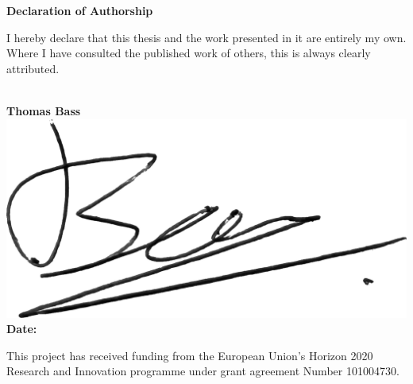 \thispagestyle{empty}
\vspace*{\fill}
\begin{center}
    \textbf{Declaration of Authorship}
\end{center}
I hereby declare that this thesis and the work presented in it are entirely my own. Where I have consulted the published work of others, this is always clearly attributed. \\[4pt]
\\[4pt]


\begin{tabbing}
\textbf{Thomas Bass} \\[16pt]
\includegraphics*[width=0.2\linewidth]{signature.png} \\[8pt]
\textbf{Date:}  \\
\end{tabbing}
\vspace*{\fill}

This project has received funding from the European Union's Horizon 2020 Research and Innovation programme under grant agreement Number 101004730.
\vspace*{\fill}